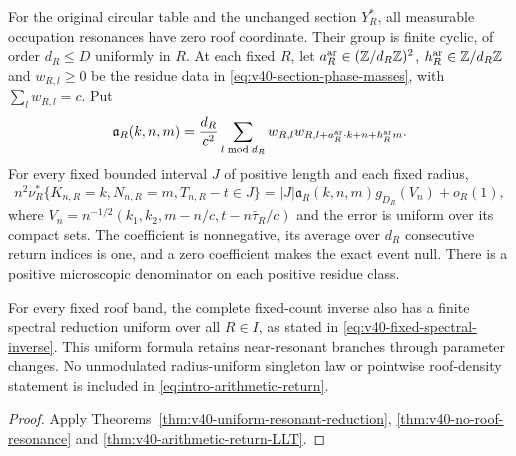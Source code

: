 \begin{leadtheorem}
\label{thm:intro-arithmetic-return}
For the original circular table and the unchanged section $Y_R^*$,
all measurable occupation resonances have zero roof coordinate. Their
group is finite cyclic, of order $d_R\le D$ uniformly in $R$. At each
fixed $R$, let $a_R^{\rm ar}\in(\mathbb Z/d_R\mathbb Z)^2$, $h_R^{\rm ar}\in\mathbb Z/d_R\mathbb Z$ and
$w_{R,l}\ge0$ be the residue data in
\eqref{eq:v40-section-phase-masses}, with $\sum_lw_{R,l}=c$.
Put
\[
 \mathfrak a_R(k,n,m)=\frac{d_R}{c^2}
   \sum_{l\bmod d_R}w_{R,l}w_{R,l+a_R^{\rm ar}\cdot k+n+h_R^{\rm ar}m}.
\]
For every fixed bounded interval $J$ of positive length and each
fixed radius,
\begin{equation}\label{eq:intro-arithmetic-return}
 n^2\nu_R^*\{K_{n,R}=k,N_{n,R}=m,T_{n,R}-t\in J\}
   =|J|\mathfrak a_R(k,n,m)g_{D_R}(V_n)+o_R(1),
\end{equation}
where $V_n=n^{-1/2}(k_1,k_2,m-n/c,t-n\bar\tau_R/c)$ and the error
is uniform over its compact sets. The coefficient is nonnegative,
its average over $d_R$ consecutive return indices is one, and a
zero coefficient makes the exact event null. There is a positive
microscopic denominator on each positive residue class.

For every fixed roof band, the complete fixed-count inverse also has
a finite spectral reduction uniform over all $R\in I$, as stated in
\eqref{eq:v40-fixed-spectral-inverse}. This uniform formula retains
near-resonant branches through parameter changes. No unmodulated
radius-uniform singleton law or pointwise roof-density statement is
included in \eqref{eq:intro-arithmetic-return}.
\end{leadtheorem}
\begin{proof}
Apply Theorems~\ref{thm:v40-uniform-resonant-reduction},
\ref{thm:v40-no-roof-resonance} and
\ref{thm:v40-arithmetic-return-LLT}.
\end{proof}

